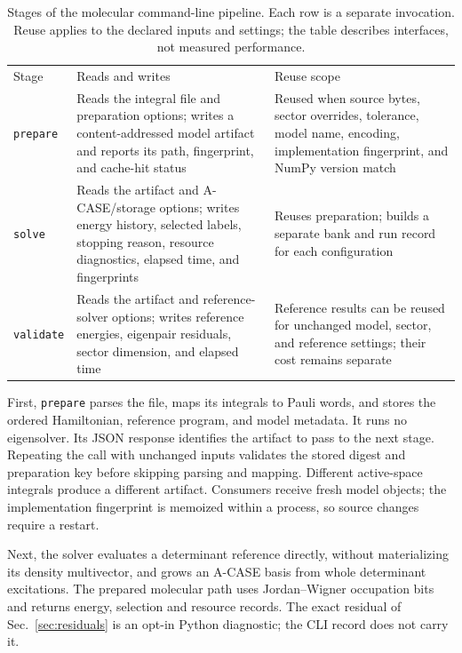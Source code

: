 \documentclass[aps,pra,reprint,superscriptaddress,nofootinbib,floatfix,
  showkeys]{revtex4-2}
\begin{document}
\begin{table}
  \caption{Stages of the molecular command-line pipeline. Each row is a
  separate invocation. Reuse applies to the declared inputs and settings;
  the table describes interfaces, not measured performance.}
  \label{tab:pipeline}
  \footnotesize
  \begin{ruledtabular}
  \begin{tabular}{@{}p{}p{}p{}@{}}
 Stage & Reads and writes & Reuse scope \\
 \colrule
 \texttt{prepare} & Reads the integral file and preparation options; writes a content-addressed model artifact and reports its path, fingerprint, and cache-hit status & Reused when source bytes, sector overrides, tolerance, model name, encoding, implementation fingerprint, and NumPy version match \\
 \texttt{solve} & Reads the artifact and A-CASE/storage options; writes energy history, selected labels, stopping reason, resource diagnostics, elapsed time, and fingerprints & Reuses preparation; builds a separate bank and run record for each configuration \\
 \texttt{validate} & Reads the artifact and reference-solver options; writes reference energies, eigenpair residuals, sector dimension, and elapsed time & Reference results can be reused for unchanged model, sector, and reference settings; their cost remains separate \\
  \end{tabular}
  \end{ruledtabular}
\end{table}

First, \texttt{prepare} parses the file, maps its integrals to Pauli words,
and stores the ordered Hamiltonian, reference program, and model metadata.
It runs no eigensolver. Its JSON response identifies the artifact to pass
to the next stage. Repeating the call with unchanged inputs validates the
stored digest and preparation key before skipping parsing and mapping.
Different active-space integrals produce a different artifact. Consumers
receive fresh model objects; the implementation fingerprint is memoized
within a process, so source changes require a restart.

Next, the solver evaluates a determinant reference directly, without
materializing its density multivector, and grows an A-CASE basis from whole
determinant excitations. The prepared molecular path uses Jordan--Wigner
occupation bits and returns energy, selection and resource records. The exact
residual of Sec.~\ref{sec:residuals} is an opt-in Python diagnostic; the CLI
record does not carry it.
\end{document}

